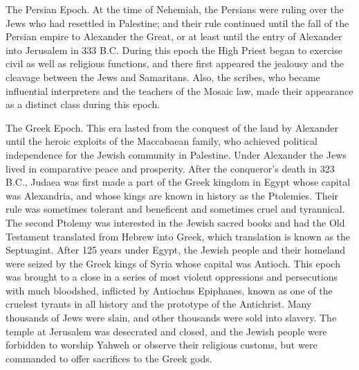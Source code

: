 The Persian Epoch. At the time of Nehemiah, the Persians were ruling over the Jews who had resettled in Palestine; and their rule continued until the fall of the Persian empire to Alexander the Great, or at least until the entry of Alexander into Jerusalem in 333 B.C. During this epoch the High Priest began to exercise civil as well as religious functions, and there first appeared the jealousy and the cleavage between the Jews and Samaritans. Also, the scribes, who became influential interpreters and the teachers of the Mosaic law, made their appearance as a distinct class during this epoch.

The Greek Epoch. This era lasted from the conquest of the land by Alexander until the heroic exploits of the Maccabaean family, who achieved political independence for the Jewish community in Palestine. Under Alexander the Jews lived in comparative peace and prosperity. After the conqueror's death in 323 B.C., Judaea was first made a part of the Greek kingdom in Egypt whose capital was Alexandria, and whose kings are known in history as the Ptolemies. Their rule was sometimes tolerant and beneficent and sometimes cruel and tyrannical. The second Ptolemy was interested in the Jewish sacred books and had the Old Testament translated from Hebrew into Greek, which translation is known as the Septuagint. After 125 years under Egypt, the Jewish people and their homeland were seized by the Greek kings of Syria whose capital was Antioch. This epoch was brought to a close in a series of most violent oppressions and persecutions with much bloodshed, inflicted by Antiochus Epiphanes, known as one of the cruelest tyrants in all history and the prototype of the Antichrist. Many thousands of Jews were slain, and other thousands were sold into slavery. The temple at Jerusalem was desecrated and closed, and the Jewish people were forbidden to worship Yahweh or observe their religious customs, but were commanded to offer sacrifices to the Greek gods.

